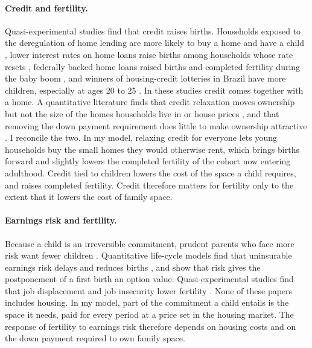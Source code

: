 \paragraph{Credit and fertility.}
Quasi-experimental studies find that credit raises births. Households exposed to the deregulation of home lending are more likely to buy a home and have a child \citep{hacamoBabiesMortgageDeregulation2021}, lower interest rates on home loans raise births among households whose rate resets \citep{cummingMonetaryPolicyBirth2024}, federally backed home loans raised births and completed fertility during the baby boom \citep{dettlingKearney2026}, and winners of housing-credit lotteries in Brazil have more children, especially at ages 20 to 25 \citep{vandoornikFazioRamadoraiSkrastinsHousingFertility2025}. In these studies credit comes together with a home. A quantitative literature finds that credit relaxation moves ownership but not the size of the homes households live in or house prices \citep{kaplanMitmanViolanteHousing2020}, and that removing the down payment requirement does little to make ownership attractive \citep{halketVasudevSaving2014}. I reconcile the two. In my model, relaxing credit for everyone lets young households buy the small homes they would otherwise rent, which brings births forward and slightly lowers the completed fertility of the cohort now entering adulthood. Credit tied to children lowers the cost of the space a child requires, and raises completed fertility. Credit therefore matters for fertility only to the extent that it lowers the cost of family space.

\paragraph{Earnings risk and fertility.}
Because a child is an irreversible commitment, prudent parents who face more risk want fewer children \citep{fraserIncomeRisk2001}. Quantitative life-cycle models find that uninsurable earnings risk delays and reduces births \citep{sommerFertilityChoiceLife2016,ejrnaesJorgensenFamilyPlanning2020,nakakuniFertilityIncomeUncertainty2026}, and \citet{deLaCroixPommeretChildbearing2021} show that risk gives the postponement of a first birth an option value. Quasi-experimental studies find that job displacement and job insecurity lower fertility \citep{delBonoWeberWinterEbmer2012,clarkLepinteurJobInsecurity2022}. None of these papers includes housing. In my model, part of the commitment a child entails is the space it needs, paid for every period at a price set in the housing market. The response of fertility to earnings risk therefore depends on housing costs and on the down payment required to own family space.

